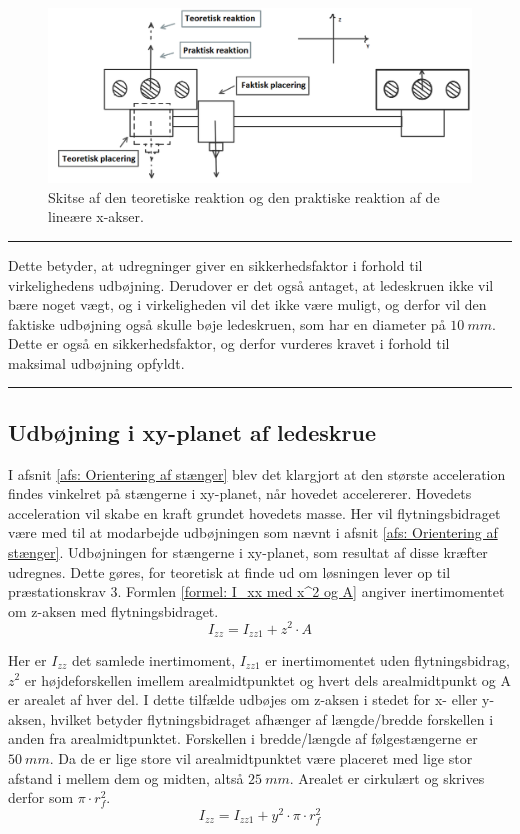 \begin{figure}[H]
    \centering
    \includegraphics[width=0.9\linewidth]{Sections/6 Detaljeløsning/Media/Praktisk vs teoretisk udbøjning.png}
    \caption{Skitse af den teoretiske reaktion og den praktiske reaktion af de lineære x-akser.}
    \label{fig: Udbøjningpraktik}
\end{figure} \plainbreak{-0.5}

Dette betyder, at udregninger giver en sikkerhedsfaktor i forhold til virkelighedens udbøjning. Derudover er det også antaget, at ledeskruen ikke vil bære noget vægt, og i virkeligheden vil det ikke være muligt, og derfor vil den faktiske udbøjning også skulle bøje ledeskruen, som har en diameter på $\SI{10}{mm}$. Dette er også en sikkerhedsfaktor, og derfor vurderes kravet i forhold til maksimal udbøjning opfyldt.


\plainbreak{2}
\subsection{Udbøjning i xy-planet af ledeskrue}
I afsnit \ref{afs: Orientering af stænger} blev det klargjort at den største acceleration findes vinkelret på stængerne i xy-planet, når hovedet accelererer. Hovedets acceleration vil skabe en kraft grundet hovedets masse. Her vil flytningsbidraget være med til at modarbejde udbøjningen som nævnt i afsnit \ref{afs: Orientering af stænger}. Udbøjningen for stængerne i xy-planet, som resultat af disse kræfter udregnes. Dette gøres, for teoretisk at finde ud om løsningen lever op til præstationskrav 3. Formlen \ref{formel: I_xx med x^2 og A} angiver inertimomentet om z-aksen med flytningsbidraget. 
\begin{equation} \label{formel: I_xx med x^2 og A}
    I_{zz}=I_{zz1}+z^2\cdot A
\end{equation}

Her er $I_{zz}$ det samlede inertimoment, $I_{zz1}$ er inertimomentet uden flytningsbidrag, $z^2$ er højdeforskellen imellem arealmidtpunktet og hvert dels arealmidtpunkt og A er arealet af hver del. I dette tilfælde udbøjes om z-aksen i stedet for x- eller y-aksen, hvilket betyder flytningsbidraget afhænger af længde/bredde forskellen i anden fra arealmidtpunktet. Forskellen i bredde/længde af følgestængerne er \(\SI{50}{mm}\). Da de er lige store vil arealmidtpunktet være placeret med lige stor afstand i mellem dem og midten, altså \(\SI{25}{mm}\). Arealet er cirkulært og skrives derfor som $\pi \cdot r_f^2$.
\begin{equation}
    I_{zz}=I_{zz1}+y^2\cdot \pi\cdot r^2_f
\end{equation}

